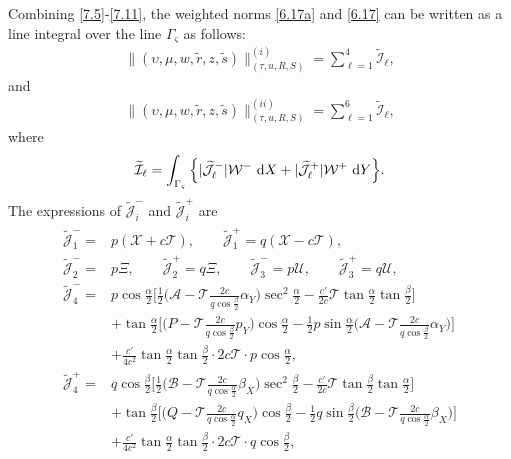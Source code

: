 \documentclass[11pt,reqno]{article}
\newcommand{\fr}{\frac}
\numberwithin{equation}{section}
\begin{document}
Combining \eqref{7.5}-\eqref{7.11}, the weighted norms \eqref{6.17a} and \eqref{6.17} can be written as a line integral over the line $\Gamma_\varsigma$ as follows:
\begin{align}\label{7.12}
\|(\upsilon, \mu, w, \tilde{r}, z, \tilde{s})\|_{(\tau, u, R, S)}^{(i)} =\sum_{\ell=1}^4\widetilde{\mathcal{I}}_\ell,
\end{align}
and
\begin{align}\label{7.13}
\|(\upsilon, \mu, w, \tilde{r}, z, \tilde{s})\|_{(\tau, u, R, S)}^{(ii)} =\sum_{\ell=1}^6\widetilde{\mathcal{I}}_\ell,
\end{align}
where
\begin{align}\label{7.14}
\begin{split}
\widetilde{\mathcal{I}}_\ell=\int_{\Gamma_\varsigma} \Big\{|\widetilde{\mathcal{J}}_{\ell}^-|\mathcal{W}^-\ {\rm d}X +|\widetilde{\mathcal{J}}_{\ell}^+|\mathcal{W}^+\ {\rm d}Y\Big\}.
\end{split}
\end{align}
The expressions of $\widetilde{\mathcal{J}}_{i}^-$ and $\widetilde{\mathcal{J}}_{i}^+$ are
\begin{align}\label{7.15}
\begin{split}
\widetilde{\mathcal{J}}_{1}^-=&p(\mathcal{X}+c\mathcal{T}),\qquad
\widetilde{\mathcal{J}}_{1}^+=q(\mathcal{X}-c\mathcal{T}), \\
\widetilde{\mathcal{J}}_{2}^-=&p\Xi, \qquad \widetilde{\mathcal{J}}_{2}^+=q\Xi, \qquad
\widetilde{\mathcal{J}}_{3}^-=p\mathcal{U}, \qquad \widetilde{\mathcal{J}}_{3}^+=q\mathcal{U}, \\
\widetilde{\mathcal{J}}_{4}^-=& p\cos\fr{\alpha}{2}\Big[\fr{1}{2} \Big(\mathcal{A}-\mathcal{T}\fr{2c}{q\cos\fr{\beta}{2}}\alpha_Y\Big)\sec^2\fr{\alpha}{2} -\fr{c'}{2c}\mathcal{T}\tan\fr{\alpha}{2}\tan\fr{\beta}{2}\Big] \\ &+\tan\fr{\alpha}{2}\Big[\Big(P-\mathcal{T}\fr{2c}{q\cos\fr{\beta}{2}}p_Y\Big)\cos\fr{\alpha}{2} -\fr{1}{2}p\sin\fr{\alpha}{2} \Big(\mathcal{A}-\mathcal{T}\fr{2c}{q\cos\fr{\beta}{2}}\alpha_Y\Big)\Big] \\
&+\fr{c'}{4c^2}\tan\fr{\alpha}{2}\tan\fr{\beta}{2}\cdot 2c\mathcal{T}\cdot p\cos\fr{\alpha}{2},  \\
\widetilde{\mathcal{J}}_{4}^+=& q\cos\fr{\beta}{2}\Big[\fr{1}{2} \Big(\mathcal{B}-\mathcal{T}\fr{2c}{q\cos\fr{\alpha}{2}}\beta_X\Big)\sec^2\fr{\beta}{2} -\fr{c'}{2c}\mathcal{T}\tan\fr{\beta}{2}\tan\fr{\alpha}{2}\Big] \\ &+\tan\fr{\beta}{2}\Big[\Big(Q-\mathcal{T}\fr{2c}{q\cos\fr{\alpha}{2}}q_X\Big)\cos\fr{\beta}{2} -\fr{1}{2}q\sin\fr{\beta}{2} \Big(\mathcal{B}-\mathcal{T}\fr{2c}{q\cos\fr{\alpha}{2}}\beta_X\Big)\Big] \\ &+\fr{c'}{4c^2}\tan\fr{\alpha}{2}\tan\fr{\beta}{2}\cdot 2c\mathcal{T}\cdot q\cos\fr{\beta}{2},
\end{split}
\end{align}
\end{document}
